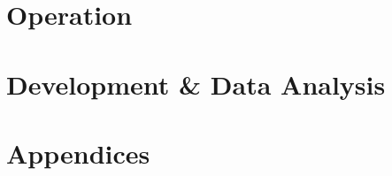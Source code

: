 \documentclass[a4paper, 11pt, oneside]{book}
\begin{document}


\part{Operation}





\part{Development \& Data Analysis}



\part{Appendices}
\appendix




\end{document}

